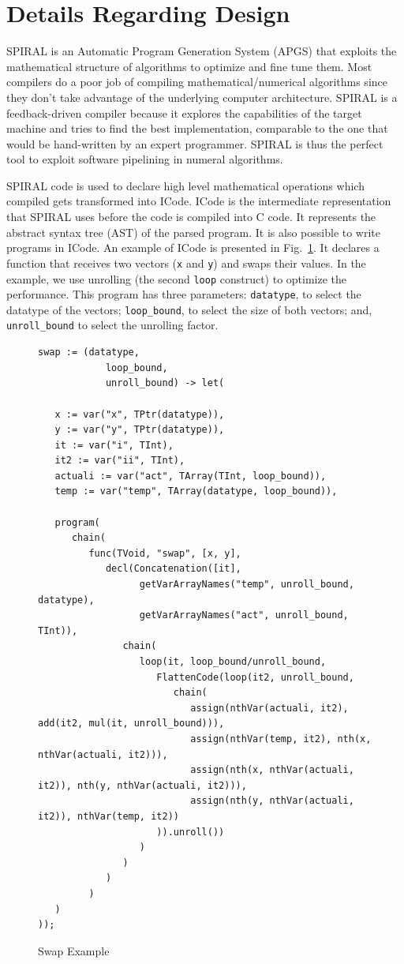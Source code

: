 \documentclass[10pt]{article}
\begin{document}
\section{Details Regarding Design}

SPIRAL is an Automatic Program Generation System (APGS) that exploits the mathematical
structure of algorithms to optimize and fine tune them. Most compilers do
a poor job of compiling mathematical/numerical algorithms since they don't take advantage
of the underlying computer architecture. SPIRAL is a feedback-driven compiler because
it explores the capabilities of the target machine and tries to find the best
implementation, comparable to the one that would be hand-written by an expert programmer.
SPIRAL is thus the perfect tool to exploit software pipelining in numeral algorithms.

SPIRAL code is used to declare high level mathematical operations which compiled gets transformed
into ICode. ICode is the intermediate representation that SPIRAL uses before the code is compiled into C code.
It represents the abstract syntax tree (AST) of the parsed program.
It is also possible to write programs in ICode. An example of ICode is presented in Fig.~\ref{fig:dswap}.
It declares a function that receives two vectors (\texttt{x} and \texttt{y}) and swaps their values.
In the example, we use unrolling (the second \texttt{loop} construct) to optimize the performance.
This program has three parameters: \texttt{datatype}, to select the datatype of the vectors;
\texttt{loop\_bound}, to select the size of both vectors; and, \texttt{unroll\_bound} to select the unrolling factor.

\lstset{basicstyle=\tiny}

\begin{figure}[ht]
\begin{lstlisting}
swap := (datatype,
            loop_bound,
            unroll_bound) -> let(

   x := var("x", TPtr(datatype)),
   y := var("y", TPtr(datatype)),
   it := var("i", TInt),
   it2 := var("ii", TInt),
   actuali := var("act", TArray(TInt, loop_bound)),
   temp := var("temp", TArray(datatype, loop_bound)),

   program(
      chain(
         func(TVoid, "swap", [x, y],
            decl(Concatenation([it],
                  getVarArrayNames("temp", unroll_bound, datatype),
                  getVarArrayNames("act", unroll_bound, TInt)),
               chain(
                  loop(it, loop_bound/unroll_bound,
                     FlattenCode(loop(it2, unroll_bound,
                        chain(
                           assign(nthVar(actuali, it2), add(it2, mul(it, unroll_bound))),
                           assign(nthVar(temp, it2), nth(x, nthVar(actuali, it2))),
                           assign(nth(x, nthVar(actuali, it2)), nth(y, nthVar(actuali, it2))),
                           assign(nth(y, nthVar(actuali, it2)), nthVar(temp, it2))
                     )).unroll())
                  )
               )
            )
         )
   )
));
\end{lstlisting}
\caption{Swap Example}
\label{fig:dswap}
\end{figure}
\end{document}
